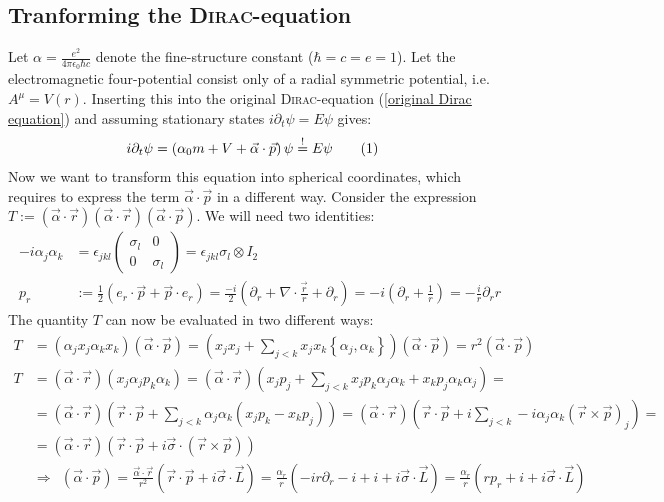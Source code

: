 \documentclass[a4paper,12pt]{article}
\newcommand\numberthis{\addtocounter{equation}{1}\tag{\theequation}}
\newcommand{\kla}{}
\newcommand{\klammer}{}
\begin{document}
\subsection{Tranforming the \textsc{Dirac}-equation}
Let $\alpha=\frac{e^2}{4\pi\epsilon_0\hbar c}$ denote the fine-structure constant ($\hbar=c=e=1$). 
Let the electromagnetic four-potential consist only of a radial symmetric potential, i.e. $A^\mu = V(r)$. Inserting this into the original \textsc{Dirac}-equation (\ref{original Dirac equation}) and assuming stationary states $i\partial_t\psi=E\psi$ gives:
\begin{align*}
i\partial_t\psi&=\kla\left( {\alpha_0m+V+\vec{\alpha}\cdot\vec{p}} \right)\psi\overset{!}{=}E\psi\numberthis\label{stationary hydrogen eigenvalue problem}
\end{align*}
Now we want to transform this equation into spherical coordinates, which requires to express the term $\vec{\alpha}\cdot\vec{p}$ in a different way. Consider the expression $T:=(\vec{\alpha}\cdot\vec{r})(\vec{\alpha}\cdot\vec{r})(\vec{\alpha}\cdot\vec{p})$. We will need two identities:
\begin{align*}
-i\alpha_j\alpha_k&=\epsilon_{jkl}\begin{pmatrix}
\sigma_l & 0 \\ 0 & \sigma_l
\end{pmatrix}=\epsilon_{jkl}\sigma_l\otimes I_2\\
p_r&:=\frac{1}{2}\kla\left( {e_r\cdot\vec{p}+\vec{p}\cdot e_r} \right)=\frac{-i}{2}\kla\left( {\partial_r+\nabla\cdot\frac{\vec{r}}{r}+\partial_r} \right)=-i\kla\left( {\partial_r+\frac{1}{r}} \right)=-\frac{i}{r}\partial_rr
\end{align*} 
The quantity $T$ can now be evaluated in two different ways:
\begin{align*}
T&=(\alpha_jx_j\alpha_kx_k)(\vec{\alpha}\cdot\vec{p})=\kla\left( {x_jx_j+\sum_{j<k} x_jx_k\klammer\left\{{\alpha_j,\alpha_k} \right\}} \right)(\vec{\alpha}\cdot\vec{p})=r^2(\vec{\alpha}\cdot\vec{p})\\
T&=(\vec{\alpha}\cdot\vec{r})(x_j\alpha_jp_k\alpha_k)=(\vec{\alpha}\cdot\vec{r})\kla\left( {x_jp_j+\sum_{j<k}x_jp_k\alpha_j\alpha_k+x_kp_j\alpha_k\alpha_j} \right)=\\
&=(\vec{\alpha}\cdot\vec{r})\kla\left( {\vec{r}\cdot\vec{p}+\sum_{j<k}\alpha_j\alpha_k(x_jp_k-x_kp_j)} \right)=(\vec{\alpha}\cdot\vec{r})\kla\left( {\vec{r}\cdot\vec{p}+i\sum_{j<k}-i\alpha_j\alpha_k(\vec{r}\times\vec{p})_j} \right)=\\
&=(\vec{\alpha}\cdot\vec{r})(\vec{r}\cdot\vec{p}+i\vec{\sigma}\cdot (\vec{r}\times\vec{p}))\\
&\Rightarrow\ \ (\vec{\alpha}\cdot\vec{p})=\frac{\vec{\alpha}\cdot\vec{r}}{r^2}(\vec{r}\cdot\vec{p}+i\vec{\sigma}\cdot\vec{L})=\frac{\alpha_r}{r}\kla\left( {-ir\partial_r-i+i+i\vec{\sigma}\cdot\vec{L}} \right)=\frac{\alpha_r}{r}\kla\left( {rp_r+i+i\vec{\sigma}\cdot\vec{L}} \right)
\end{align*}
\end{document}
